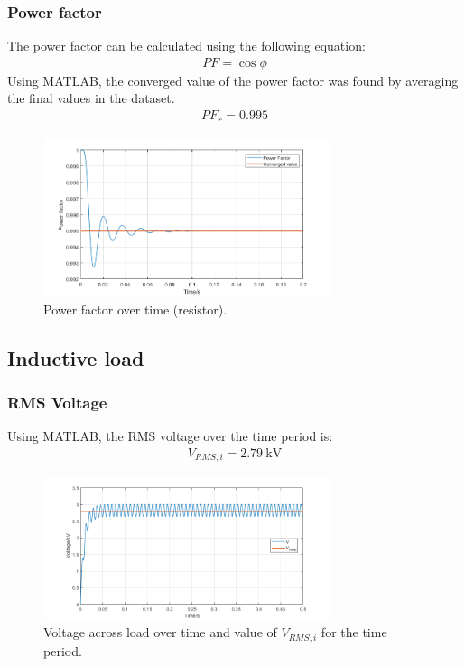 \subsubsection{Power factor}
The power factor can be calculated using the following equation:
\begin{gather}
    PF = \cos \phi
\end{gather}
Using MATLAB, the converged value of the power factor was found by averaging the final values in the dataset.
\begin{gather}
    PF_{r} = 0.995
\end{gather}
\begin{figure}[H]
    \centering
    \includegraphics[width = 0.75\textwidth]{img/figure6.png}
    \caption{Power factor over time (resistor).}
    \label{fig:PFResistor}
\end{figure}
\subsection{Inductive load}
\subsubsection{RMS Voltage}
Using MATLAB, the RMS voltage over the time period is:
\begin{gather}
    V_{RMS,i} = \SI{2.79}{\kilo\volt}
\end{gather}
\begin{figure}[H]
    \centering
    \includegraphics[width = 0.75\textwidth]{img/figure7.png}
    \caption{Voltage across load over time and value of $V_{RMS,i}$ for the time period.}
    \label{fig:VRMSInductor}
\end{figure}
